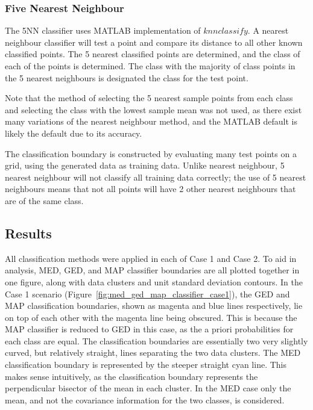 \subsubsection{Five Nearest Neighbour}

The 5NN classifier uses MATLAB implementation of $knnclassify$. A nearest neighbour classifier will test a point and compare its distance to all other known classified points. The 5 nearest classified points are determined, and the class of each of the points is determined. The class with the majority of class points in the 5 nearest neighbours is designated the class for the test point.

Note that the method of selecting the 5 nearest sample points from each class and selecting the class with the lowest sample mean was not used, as there exist many variations of the nearest neighbour method, and the MATLAB default is likely the default due to its accuracy.

The classification boundary is constructed by evaluating many test points on a grid, using the generated data as training data. Unlike nearest neighbour, 5 nearest neighbour will not classify all training data correctly; the use of 5 nearest neighbours means that not all points will have 2 other nearest neighbours that are of the same class.



\subsection{Results}
All classification methods were applied in each of Case 1 and Case 2. To aid in analysis, MED, GED, and MAP classifier boundaries are all plotted together in one figure, along with data clusters and unit standard deviation contours. In the Case 1 scenario (Figure~\ref{fig:med_ged_map_classifier_case1}), the GED and MAP classification boundaries, shown as magenta and blue lines respectively, lie on top of each other with the magenta line being obscured. This is because the MAP classifier is reduced to GED in this case, as the a priori probabilities for each class are equal. The classification boundaries are essentially two very slightly curved, but relatively straight, lines separating the two data clusters. The MED classification boundary is represented by the steeper straight cyan line. This makes sense intuitively, as the classification boundary represents the perpendicular bisector of the mean in each cluster. In the MED case only the mean, and not the covariance information for the two classes, is considered.

